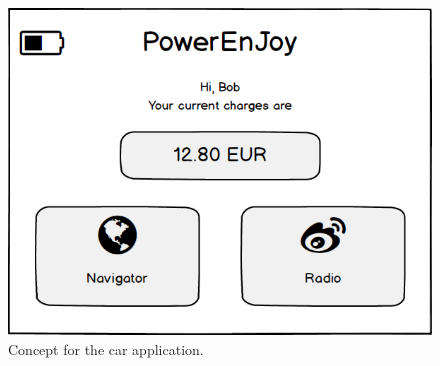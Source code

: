 \begin{figure}[H]
	\centering
	\includegraphics[width=\textwidth]{mockup/VehicleApplication.png}
	\caption{Concept for the car application.}
\end{figure}

